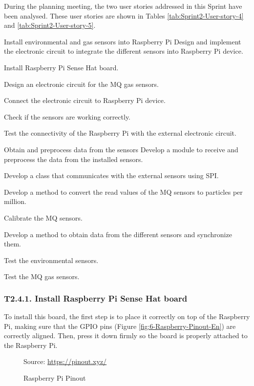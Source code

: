 During the planning meeting, the two user stories addressed in this Sprint have been analysed. These user stories are shown in Tables \ref{tab:Sprint2-User-story-4} and \ref{tab:Sprint2-User-story-5}.

{Install environmental and gas sensors into Raspberry Pi}
{Design and implement the electronic circuit to integrate the different sensors into Raspberry Pi device.}
{	\item Install Raspberry Pi Sense Hat board.
	\item Design an electronic circuit for the MQ gas sensors.
	\item Connect the electronic circuit to Raspberry Pi device.
}{	\item Check if the sensors are working correctly.
	\item Test the connectivity of the Raspberry Pi with the external electronic circuit.
}

{Obtain and preprocess data from the sensors}
{Develop a module to receive and preprocess the data from the installed sensors.}
{	\item Develop a class that communicates with the external sensors using \ac{SPI}.
	\item Develop a method to convert the read values of the MQ sensors to particles per million.
	\item Calibrate the MQ sensors.
	\item Develop a method to obtain data from the different sensors and synchronize them.
}{	\item Test the environmental sensors.
	\item Test the MQ gas sensors.
}


\subsubsection{T2.4.1. Install Raspberry Pi Sense Hat board}
To install this board, the first step is to place it correctly on top of the Raspberry Pi, making sure that the GPIO pins (Figure \ref{fig:6-Raspberry-Pinout-En}) are correctly aligned. Then, press it down firmly so the board is properly attached to the Raspberry Pi.

\begin{figure}[htb]
	\centering
	\caption{Raspberry Pi Pinout}
	\label{fig:6-Raspberry-Pinout}{Source: \url{https://pinout.xyz/}}
\end{figure}

